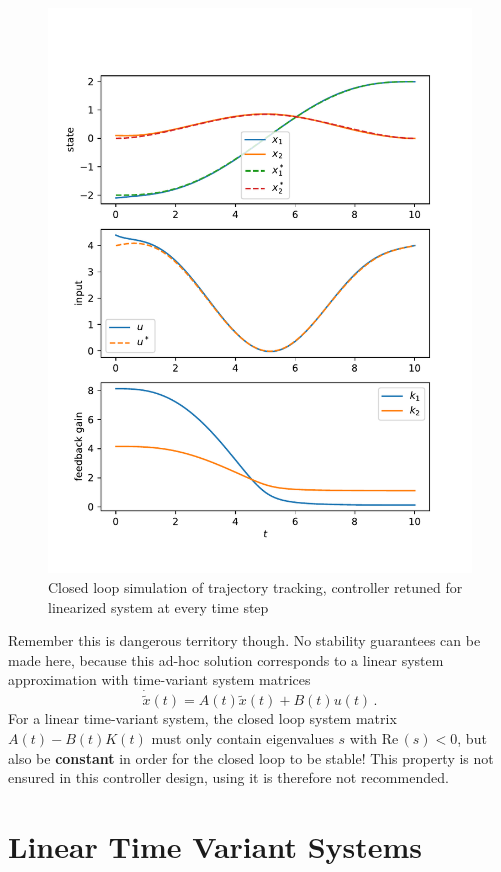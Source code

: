 \documentclass[a4paper,11pt,headinclude=true,headsepline,parskip=half,DIV=13]{scrartcl}
\begin{document}
\begin{figure}[ht]
    \centering
    \includegraphics[scale=1]{img/ludyk_pseudoltv.pdf}
    \caption{Closed loop simulation of trajectory tracking, controller retuned for linearized system at every time step}
    \label{fig:ludyk_pseudoltv}
\end{figure}

Remember this is dangerous territory though.
No stability guarantees can be made here, because this ad-hoc solution corresponds to a linear system approximation with time-variant system matrices
$$
\dot{\tilde x}(t) = A(t)\tilde x(t) + B(t) u(t)\, .
$$
For a linear time-variant system, the closed loop system matrix $A(t) - B(t)K(t)$ must only contain eigenvalues $s$ with $\mathrm{Re}\,(s) < 0$, but also be \textbf{constant} in order for the closed loop to be stable!
This property is not ensured in this controller design, using it is therefore not recommended.

\FloatBarrier
\section{Linear Time Variant Systems}
\end{document}
